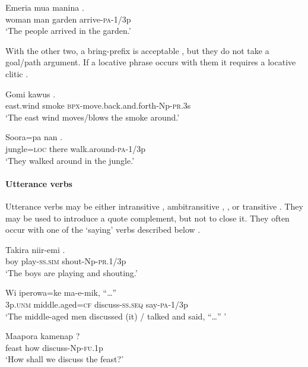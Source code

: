 \ea%
\label{ex:3:x292}
\gll Emeria mua manina . \\
woman man garden arrive-\textsc{pa}-1/3p \\
\glt`The people arrived in the garden.'
\z

With the other two, a bring-prefix is acceptable , but they do not take a goal/path argument. If a locative phrase occurs with them it requires a locative clitic .

\ea%
\label{ex:3:x293}
\gll Gomi kawus . \\
east.wind smoke \textsc{bpx}-move.back.and.forth-Np-\textsc{pr}.3s \\
\glt`The east wind moves/blows the smoke around.'
\z

\ea%
\label{ex:3:x436}
\gll Soora=pa nan . \\
jungle=\textsc{loc} there walk.around-\textsc{pa}-1/3p \\
\glt`They walked around in the jungle.'
\z

\paragraph{Utterance verbs}\label{sec:3.8.4.4.6}
{}
Utterance verbs may be either intransitive , ambitransitive , , or transitive . They may be used to introduce a quote complement, but not to close it. They often occur with one of the `saying' verbs described below .

\ea%
\label{ex:3:x309}
\gll Takira niir-emi . \\
boy play-\textsc{ss}.\textsc{sim} shout-Np-\textsc{pr}.1/3p \\
\glt`The boys are playing and shouting.'
\z

\ea%
\label{ex:3:x310}
\gll Wi iperowa=ke  ma-e-mik, ``{\dots}'' \\
3p.\textsc{unm} middle.aged=\textsc{cf} discuss-\textsc{ss}.\textsc{seq} say-\textsc{pa}-1/3p\\
\glt`The middle-aged men discussed (it) / talked and said, ``{\dots}'' '
\z

\ea%
\label{ex:3:x1927}
\gll Maapora kamenap ? \\
feast how discuss-Np-\textsc{fu}.1p\\
\glt`How shall we discuss the feast?'
\z

